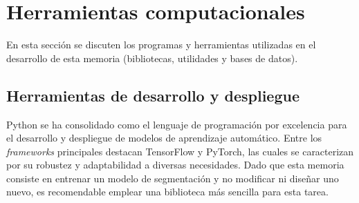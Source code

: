 \section{Herramientas computacionales}
En esta sección se discuten los programas y herramientas utilizadas en el desarrollo de esta memoria (bibliotecas, utilidades y bases de datos).

\subsection{Herramientas de desarrollo y despliegue}
Python se ha consolidado como el lenguaje de programación por excelencia para el desarrollo y despliegue de modelos de aprendizaje automático. Entre los \textit{frameworks} principales destacan TensorFlow y PyTorch, las cuales se caracterizan por su robustez y adaptabilidad a diversas necesidades. Dado que esta memoria consiste en entrenar un modelo de segmentación y no modificar ni diseñar uno nuevo, es recomendable emplear una biblioteca más sencilla para esta tarea.

